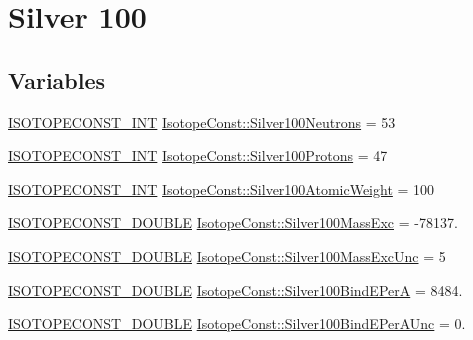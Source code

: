 \hypertarget{group___isotope_const-_silver-_ag100}{}\section{Silver 100}
\label{group___isotope_const-_silver-_ag100}
\subsection*{Variables}
\begin{DoxyCompactItemize}
\item 
\mbox{\hyperlink{group___isotope_const-_macros_ga5f18360b3e99483a35c32d789e62621c}{I\+S\+O\+T\+O\+P\+E\+C\+O\+N\+S\+T\+\_\+\+I\+NT}} \mbox{\hyperlink{group___isotope_const-_silver-_ag100_gacbba9e66b3e98ec26f8a72794e8c8573}{Isotope\+Const\+::\+Silver100\+Neutrons}} = 53
\item 
\mbox{\hyperlink{group___isotope_const-_macros_ga5f18360b3e99483a35c32d789e62621c}{I\+S\+O\+T\+O\+P\+E\+C\+O\+N\+S\+T\+\_\+\+I\+NT}} \mbox{\hyperlink{group___isotope_const-_silver-_ag100_gaad95ca021a6fc4158e4ee3c86b72bc4c}{Isotope\+Const\+::\+Silver100\+Protons}} = 47
\item 
\mbox{\hyperlink{group___isotope_const-_macros_ga5f18360b3e99483a35c32d789e62621c}{I\+S\+O\+T\+O\+P\+E\+C\+O\+N\+S\+T\+\_\+\+I\+NT}} \mbox{\hyperlink{group___isotope_const-_silver-_ag100_ga1cb556e29639f852f306cc8c39c8d817}{Isotope\+Const\+::\+Silver100\+Atomic\+Weight}} = 100
\item 
\mbox{\hyperlink{group___isotope_const-_macros_ga8f45a7272ce02c0b4c65c44636ed719a}{I\+S\+O\+T\+O\+P\+E\+C\+O\+N\+S\+T\+\_\+\+D\+O\+U\+B\+LE}} \mbox{\hyperlink{group___isotope_const-_silver-_ag100_gaba231d6bb17c738f77d62e4e007d617d}{Isotope\+Const\+::\+Silver100\+Mass\+Exc}} = -\/78137.
\item 
\mbox{\hyperlink{group___isotope_const-_macros_ga8f45a7272ce02c0b4c65c44636ed719a}{I\+S\+O\+T\+O\+P\+E\+C\+O\+N\+S\+T\+\_\+\+D\+O\+U\+B\+LE}} \mbox{\hyperlink{group___isotope_const-_silver-_ag100_ga8837d389743efccc1cad17598455c134}{Isotope\+Const\+::\+Silver100\+Mass\+Exc\+Unc}} = 5
\item 
\mbox{\hyperlink{group___isotope_const-_macros_ga8f45a7272ce02c0b4c65c44636ed719a}{I\+S\+O\+T\+O\+P\+E\+C\+O\+N\+S\+T\+\_\+\+D\+O\+U\+B\+LE}} \mbox{\hyperlink{group___isotope_const-_silver-_ag100_ga91740c93bff3c4cba9dbce53ebace8f3}{Isotope\+Const\+::\+Silver100\+Bind\+E\+PerA}} = 8484.
\item 
\mbox{\hyperlink{group___isotope_const-_macros_ga8f45a7272ce02c0b4c65c44636ed719a}{I\+S\+O\+T\+O\+P\+E\+C\+O\+N\+S\+T\+\_\+\+D\+O\+U\+B\+LE}} \mbox{\hyperlink{group___isotope_const-_silver-_ag100_ga85386bef58430822c147bb20be53aa85}{Isotope\+Const\+::\+Silver100\+Bind\+E\+Per\+A\+Unc}} = 0.

\end{DoxyCompactItemize}
